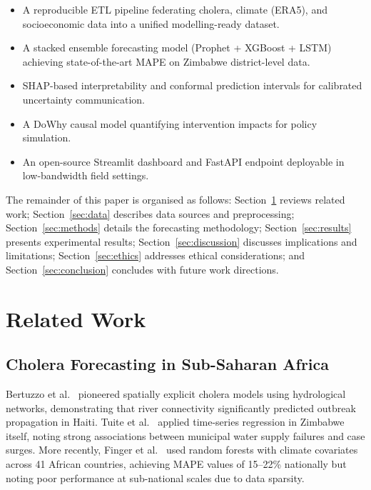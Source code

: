 \documentclass[conference]{IEEEtran}
\begin{document}
\begin{itemize}
    \item A reproducible ETL pipeline federating cholera, climate (ERA5), and
    socioeconomic data into a unified modelling-ready dataset.
    \item A stacked ensemble forecasting model (Prophet + XGBoost + LSTM)
    achieving state-of-the-art MAPE on Zimbabwe district-level data.
    \item SHAP-based interpretability and conformal prediction intervals for
    calibrated uncertainty communication.
    \item A DoWhy causal model quantifying intervention impacts for policy
    simulation.
    \item An open-source Streamlit dashboard and FastAPI endpoint deployable
    in low-bandwidth field settings.
\end{itemize}

The remainder of this paper is organised as follows: Section~\ref{sec:related}
reviews related work; Section~\ref{sec:data} describes data sources and
preprocessing; Section~\ref{sec:methods} details the forecasting methodology;
Section~\ref{sec:results} presents experimental results; Section~\ref{sec:discussion}
discusses implications and limitations; Section~\ref{sec:ethics} addresses
ethical considerations; and Section~\ref{sec:conclusion} concludes with future
work directions.


\section{Related Work}
\label{sec:related}

\subsection{Cholera Forecasting in Sub-Saharan Africa}

Bertuzzo et al.~\cite{bertuzzo2010spatially} pioneered spatially explicit
cholera models using hydrological networks, demonstrating that river
connectivity significantly predicted outbreak propagation in Haiti. Tuite et
al.~\cite{tuite2011cholera} applied time-series regression in Zimbabwe itself,
noting strong associations between municipal water supply failures and case
surges. More recently, Finger et al.~\cite{finger2020cholera} used random
forests with climate covariates across 41 African countries, achieving MAPE
values of 15--22\% nationally but noting poor performance at sub-national
scales due to data sparsity.
\end{document}
